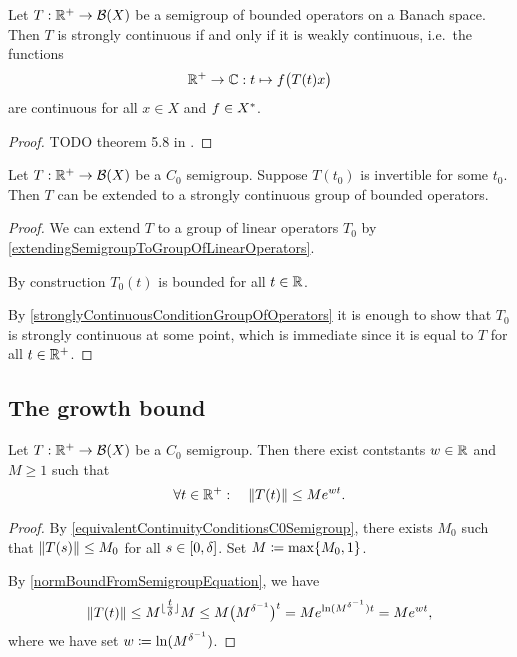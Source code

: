 \begin{proposition}
Let $T:\mathbb{R}^+\to \operatorname{\mathcal{B}}(X)$ be a semigroup of bounded operators on a Banach space. Then $T$ is strongly continuous \textup{if and only if} it is weakly continuous, i.e.\ the functions
\[ \mathbb{R}^+ \to \mathbb{C}: t\mapsto f\big(T(t)x\big) \]
are continuous for all $x\in X$ and $f\in {X}^*$.
\end{proposition}
\begin{proof}
TODO theorem 5.8 in \cite{engel_one-parameter_2000}.
\end{proof}



\begin{proposition}
Let $T:\mathbb{R}^+\to \operatorname{\mathcal{B}}(X)$ be a $C_0$ semigroup. Suppose $T(t_0)$ is invertible for some $t_0$. Then $T$ can be extended to a strongly continuous group of bounded operators.
\end{proposition}
\begin{proof}
We can extend $T$ to a group of linear operators $T_0$ by \ref{extendingSemigroupToGroupOfLinearOperators}.

By construction $T_0(t)$ is bounded for all $t\in \mathbb{R}$.

By \ref{stronglyContinuousConditionGroupOfOperators} it is enough to show that $T_0$ is strongly continuous at some point, which is immediate since it is equal to $T$ for all $t\in \mathbb{R}^+$.
\end{proof}


\subsection{The growth bound}
\begin{proposition} \label{growthBoundNotInfinite}
Let $T: \mathbb{R}^+ \to \operatorname{\mathcal{B}}(X)$ be a $C_0$ semigroup. Then there exist contstants $w\in \mathbb{R}$ and $M\geq 1$ such that
\[ \forall t\in \mathbb{R}^+:\quad \lVert T(t)\rVert \leq Me^{wt}. \]
\end{proposition}
\begin{proof}
By \ref{equivalentContinuityConditionsC0Semigroup}, there exists $M_0$ such that $\lVert T(s)\rVert \leq M_0$ for all $s\in \interval{0,\delta}$. Set $M \coloneqq \max\{M_0, 1\}$.

By \ref{normBoundFromSemigroupEquation}, we have
\[ \lVert T(t)\rVert \leq M^{\lfloor\tfrac{t}{\delta}\rfloor}M \leq M\big(M^{\delta^{-1}}\big)^t = Me^{\ln(M^{\delta^{-1}})t} = Me^{wt}, \]
where we have set $w\coloneqq \ln(M^{\delta^{-1}})$.
\end{proof}

